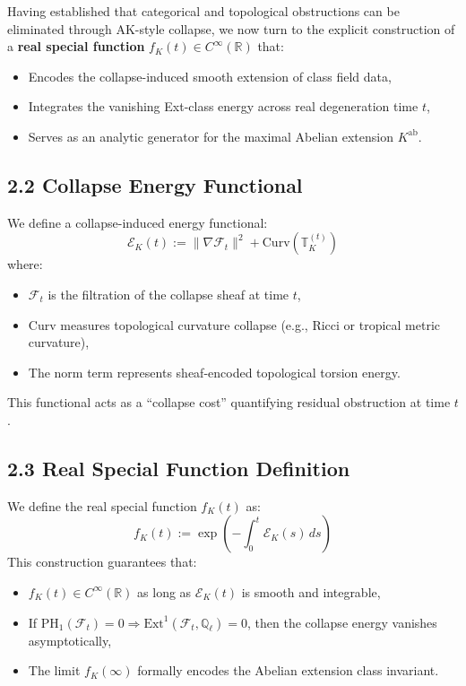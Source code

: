 \documentclass[11pt]{article}
\begin{document}
Having established that categorical and topological obstructions can be eliminated through AK-style collapse, we now turn to the explicit construction of a \textbf{real special function} \( f_K(t) \in C^\infty(\mathbb{R}) \) that:
\begin{itemize}
    \item Encodes the collapse-induced smooth extension of class field data,
    \item Integrates the vanishing Ext-class energy across real degeneration time \( t \),
    \item Serves as an analytic generator for the maximal Abelian extension \( K^{\mathrm{ab}} \).
\end{itemize}

\subsection*{2.2 Collapse Energy Functional}

We define a collapse-induced energy functional:
\[
\mathcal{E}_K(t) := \|\nabla \mathcal{F}_t\|^2 + \mathrm{Curv}(\mathbb{T}_K^{(t)})
\]
where:
\begin{itemize}
    \item \( \mathcal{F}_t \) is the filtration of the collapse sheaf at time \( t \),
    \item \( \mathrm{Curv} \) measures topological curvature collapse (e.g., Ricci or tropical metric curvature),
    \item The norm term represents sheaf-encoded topological torsion energy.
\end{itemize}

This functional acts as a “collapse cost” quantifying residual obstruction at time \( t \).

\subsection*{2.3 Real Special Function Definition}

We define the real special function \( f_K(t) \) as:
\[
\boxed{
f_K(t) := \exp\left( - \int_0^t \mathcal{E}_K(s)\, ds \right)
}
\]
This construction guarantees that:
\begin{itemize}
    \item \( f_K(t) \in C^\infty(\mathbb{R}) \) as long as \( \mathcal{E}_K(t) \) is smooth and integrable,
    \item If \( \mathrm{PH}_1(\mathcal{F}_t) = 0 \Rightarrow \mathrm{Ext}^1(\mathcal{F}_t, \mathbb{Q}_\ell) = 0 \), then the collapse energy vanishes asymptotically,
    \item The limit \( f_K(\infty) \) formally encodes the Abelian extension class invariant.
\end{itemize}
\end{document}

